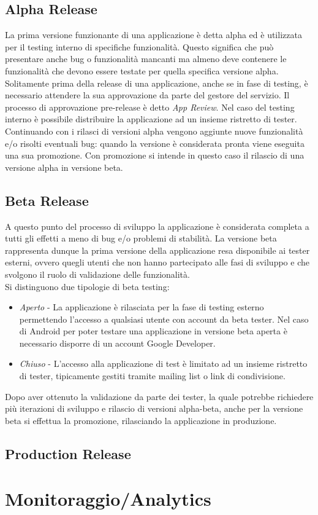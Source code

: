 \subsection{Alpha Release}
La prima versione funzionante di una applicazione è detta alpha ed è utilizzata per il testing interno di specifiche funzionalità. Questo significa che può presentare anche bug o funzionalità mancanti ma almeno deve contenere le funzionalità che devono essere testate per quella specifica versione alpha. \\
Solitamente prima della release di una applicazione, anche se in fase di testing, è necessario attendere la sua approvazione da parte del gestore del servizio. Il processo di approvazione pre-release è detto \textit{App Review}. Nel caso del testing interno è possibile distribuire la applicazione ad un insieme ristretto di tester.\\
Continuando con i rilasci di versioni alpha vengono aggiunte nuove funzionalità e/o risolti eventuali bug: quando la versione è considerata pronta viene eseguita una sua promozione. Con promozione si intende in questo caso il rilascio di una versione alpha in versione beta.

\subsection{Beta Release}
A questo punto del processo di sviluppo la applicazione è considerata completa a tutti gli effetti a meno di bug e/o problemi di stabilità. La versione beta rappresenta dunque la prima versione della applicazione resa disponibile ai tester esterni, ovvero quegli utenti che non hanno partecipato alle fasi di sviluppo e che svolgono il ruolo di validazione delle funzionalità.\\
Si distinguono due tipologie di beta testing:
\begin{itemize}
    \item \textit{Aperto} - La applicazione è rilasciata per la fase di testing esterno permettendo l'accesso a qualsiasi utente con account da beta tester. Nel caso di Android per poter testare una applicazione in versione beta aperta è necessario disporre di un account Google Developer.
    \item \textit{Chiuso} - L'accesso alla applicazione di test è limitato ad un insieme ristretto di tester, tipicamente gestiti tramite mailing list o link di condivisione.
\end{itemize}
Dopo aver ottenuto la validazione da parte dei tester, la quale potrebbe richiedere più iterazioni di sviluppo e rilascio di versioni alpha-beta, anche per la versione beta si effettua la promozione, rilasciando la applicazione in produzione.

\subsection{Production Release}



\section{Monitoraggio/Analytics}
